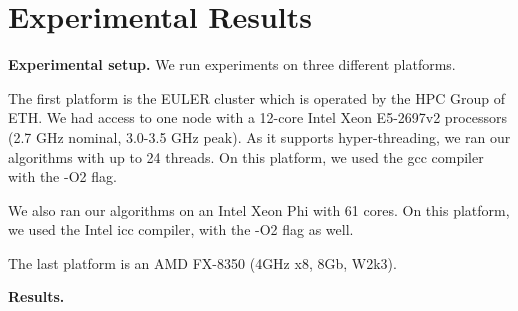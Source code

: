 \documentclass[letterpaper]{article}
\newcommand{\mypar}[1]{{\bf #1.}} %
\begin{document}
	
	
	\section{Experimental Results}\label{sec:exp}
	
	
	\mypar{Experimental setup}
	We run experiments on three different platforms.
	
	The first platform is the EULER cluster which is operated by the HPC Group of ETH. 
	We had access to one node with a 12-core Intel Xeon E5-2697v2 processors (2.7 GHz nominal, 3.0-3.5 GHz peak). 
	As it supports hyper-threading, we ran our algorithms with up to 24 threads. 
	On this platform, we used the gcc compiler with the -O2 flag.
	
	We also ran our algorithms on an Intel Xeon Phi with 61 cores. On this platform, we used the Intel icc compiler, with the -O2 flag as well.
	
	The last platform is an AMD FX-8350 (4GHz x8, 8Gb, W2k3).
	
	\mypar{Results}
%	
	
	
	
\end{document}
